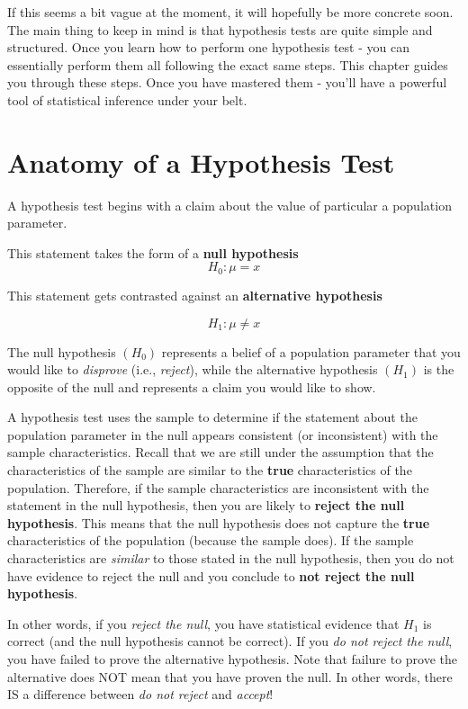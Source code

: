 \documentclass[
]{book}
\begin{document}
If this seems a bit vague at the moment, it will hopefully be more concrete soon. The main thing to keep in mind is that hypothesis tests are quite simple and structured. Once you learn how to perform one hypothesis test - you can essentially perform them all following the exact same steps. This chapter guides you through these steps. Once you have mastered them - you'll have a powerful tool of statistical inference under your belt.

\section{Anatomy of a Hypothesis Test}\label{anatomy-of-a-hypothesis-test}

A hypothesis test begins with a claim about the value of particular a population parameter.

This statement takes the form of a \textbf{null hypothesis}
\[H_0 : \mu = x\]

This statement gets contrasted against an \textbf{alternative hypothesis}

\[H_1 : \mu \neq x\]

The null hypothesis \((H_0)\) represents a belief of a population parameter that you would like to \emph{disprove} (i.e., \emph{reject}), while the alternative hypothesis \((H_1)\) is the opposite of the null and represents a claim you would like to show.

A hypothesis test uses the sample to determine if the statement about the population parameter in the null appears consistent (or inconsistent) with the sample characteristics. Recall that we are still under the assumption that the characteristics of the sample are similar to the \textbf{true} characteristics of the population. Therefore, if the sample characteristics are inconsistent with the statement in the null hypothesis, then you are likely to \textbf{reject the null hypothesis}. This means that the null hypothesis does not capture the \textbf{true} characteristics of the population (because the sample does). If the sample characteristics are \emph{similar} to those stated in the null hypothesis, then you do not have evidence to reject the null and you conclude to \textbf{not reject the null hypothesis}.

In other words, if you \emph{reject the null}, you have statistical evidence that \(H_1\) is correct (and the null hypothesis cannot be correct). If you \emph{do not reject the null}, you have failed to prove the alternative hypothesis. Note that failure to prove the alternative does NOT mean that you have proven the null. In other words, there IS a difference between \emph{do not reject} and \emph{accept}!
\end{document}
